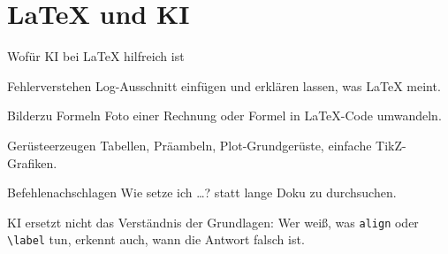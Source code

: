 \section{\LaTeX{} und KI}

\begin{frame}{Wofür KI bei \LaTeX{} hilfreich ist}
  \begin{tcbraster}[raster columns=4, raster equal height, raster column skip=8pt]
    \begin{karte}{Fehler}{verstehen}
      Log-Ausschnitt einfügen und erklären lassen, was \LaTeX{} meint.
    \end{karte}
    \begin{karte}{Bilder}{zu Formeln}
      Foto einer Rechnung oder Formel in \LaTeX-Code umwandeln.
    \end{karte}
    \begin{karte}{Gerüste}{erzeugen}
      Tabellen, Präambeln, Plot-Grundgerüste, einfache TikZ-Grafiken.
    \end{karte}
    \begin{karte}{Befehle}{nachschlagen}
      \glqq Wie setze ich \dots?\grqq{} statt lange Doku zu durchsuchen.
    \end{karte}
  \end{tcbraster}
  \vspace{0.8em}
  \begin{merke}
    KI ersetzt nicht das Verständnis der Grundlagen: Wer weiß, was \texttt{align} oder \texttt{\textbackslash label} tun, erkennt auch, wann die Antwort falsch ist.
  \end{merke}
\end{frame}

